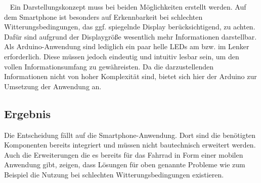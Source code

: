 \begin{description}[leftmargin=0.7cm,style=nextline]
  \item[Darstellung] ~ Ein Darstellungskonzept muss bei beiden Möglichkeiten erstellt werden. Auf dem \gls{Smartphone} ist besonders auf Erkennbarkeit bei schlechten Witterungsbedingungen, das ggf. spiegelnde Display berücksichtigend, zu achten. Dafür sind aufgrund der Displaygröße wesentlich mehr Informationen darstellbar. Als \gls{Arduino}-Anwendung sind lediglich ein paar helle \glspl{LED} am bzw. im Lenker erforderlich. Diese müssen jedoch eindeutig und intuitiv lesbar sein, um den vollen Informationsumfang zu gewähreisten. Da die darzustellenden Informationen nicht von hoher Komplexität sind, bietet sich hier der Arduino zur Umsetzung der Anwendung an. \\
\end{description}
\subsection*{Ergebnis}  
Die Entscheidung fällt auf die \gls{Smartphone}-Anwendung. Dort sind die benötigten Komponenten bereits integriert und müssen nicht bautechnisch erweitert werden. Auch die Erweiterungen die es bereits für das Fahrrad in Form einer mobilen Anwendung gibt, zeigen, dass Lösungen für oben genannte Probleme wie zum Beispiel die Nutzung bei schlechten Witterungsbedingungen existieren.
